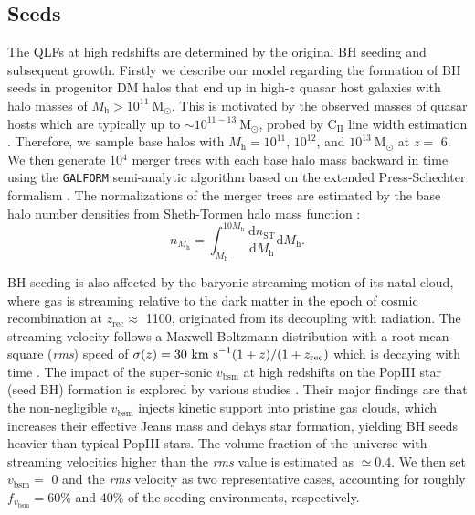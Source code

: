 \documentclass[nolinenumbers,preprint2,tighten]{aastex631}
\newcommand{\Msun}{\mathrm{M_\odot}}
\newcommand{\Mh}{M_\mathrm{h}}
\newcommand{\CII}{\mathrm{C_{II}}}
\newcommand{\vbsm}{v_\mathrm{bsm}}
\newcommand{\D}{\mathrm{d}}
\begin{document}
\begin{CJK*}{UTF8}{gbsn}
\subsection{Seeds}\label{sec:seed}
The QLFs at high redshifts are determined by the original BH seeding and subsequent growth. 
Firstly we describe our model regarding the formation of BH seeds in progenitor DM halos 
that end up in high-$z$ quasar host galaxies with halo masses of $\Mh>10^{11}~\Msun$.
This is motivated by the observed masses of quasar hosts which are typically up to $\sim 10^{11-13}~\Msun$, 
probed by $\CII$ line width estimation \citep{2019ApJ...872L..29S}.
Therefore, we sample base halos with $\Mh = 10^{11}$, $10^{12}$, and $10^{13} ~\Msun$ at $z=$ 6. 
We then generate 10$^4$ merger trees with each base halo mass backward in time using the {\tt GALFORM} 
semi-analytic algorithm based on the extended Press-Schechter formalism 
\citep{1974ApJ...187..425P,2000MNRAS.319..168C,2008MNRAS.383..557P}.
The normalizations of the merger trees are estimated by the base halo number densities from Sheth-Tormen halo mass function \citep{2001MNRAS.323....1S}:
\begin{equation}
n_{\Mh}= \int_{\Mh}^{10\Mh}  \frac{\D n_{\mathrm{ST}}} {\D \Mh} \D \Mh.
\label{eq:nST}
\end{equation}

BH seeding is also affected by the baryonic streaming motion of its natal cloud, 
where gas is streaming relative to the dark matter in the epoch of cosmic recombination at $z_\mathrm{rec}\approx$ 1100, 
originated from its decoupling with radiation.
The streaming velocity follows a Maxwell-Boltzmann distribution with a root-mean-square (\textit{rms}) speed of 
$\sigma(z) = 30~{\rm km~s}^{-1} (1+z)/(1+z_{\mathrm{rec}})$ which is decaying with time \citep{2010PhRvD..82h3520T}.
The impact of the super-sonic $\vbsm$ at high redshifts on the PopIII star (seed BH) formation 
is explored by various studies \citep{2012MNRAS.424.1335F,2014MNRAS.439.1092T,2017Sci...357.1375H,2019MNRAS.484.3510S,2021ApJ...917...60L}.
Their major findings are that the non-negligible $\vbsm$ injects kinetic support into pristine gas clouds, 
which increases their effective Jeans mass and delays star formation, 
yielding BH seeds heavier than typical PopIII stars. 
The volume fraction of the universe with streaming velocities higher than the \textit{rms} value
is estimated as $\simeq 0.4$. We then set $\vbsm=$ 0 and the \textit{rms} velocity as two representative cases, 
accounting for roughly $f_{\vbsm} = 60\%$ and $40\%$ of the seeding environments, respectively. 


\end{CJK*}
\end{document}
